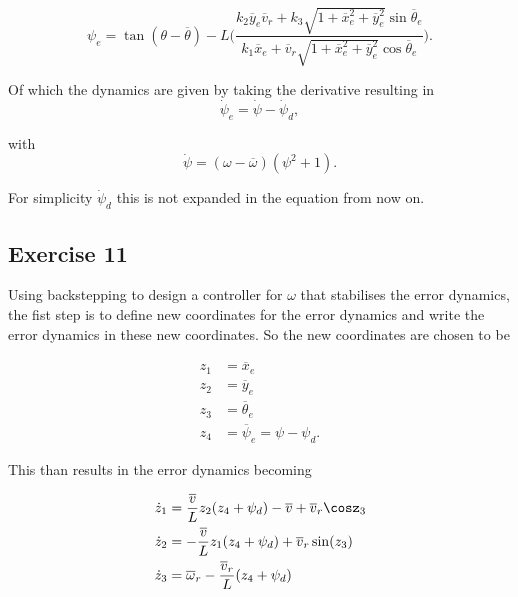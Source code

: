 \begin{equation}
    \psi_e = \tan(\theta-\overline{\theta}) - L \Big( \frac{k_2\overline{y}_e\overline{v}_r + k_3 \sqrt{1+\overline{x}_e^2+\overline{y}_e^2}\sin\overline{\theta}_e}{k_1\overline{x}_e + \overline{v}_r\sqrt{1+\overline{x}_e^2+\overline{y}_e^2}\cos\overline{\theta}_e} \Big). \label{eq:ex10_psi_e}
\end{equation}

Of which the dynamics are given by taking the derivative resulting in
\begin{equation}
    \dot{\psi}_e = \dot{\psi} - \dot{\psi}_d, \label{eq:ex10_psiedot}
\end{equation}

with
\begin{equation}
    \dot{\psi} = (\omega - \overline{\omega})(\psi^2 + 1). \label{eq:ex10_psidot}
\end{equation}

For simplicity $\dot{\psi}_d$ this is not expanded in the equation from now on.

\subsection{Exercise 11}
Using backstepping to design a controller for $\omega$ that stabilises the error dynamics, the fist step is to define new coordinates for the error dynamics and write the error dynamics in these new coordinates. So the new coordinates are chosen to be

\begin{align}
    z_1 &= \overline{x}_e \label{eq:ex11_newcoordsz_1} \\
    z_2 &= \overline{y}_e \label{eq:ex11_newcoordsz_2} \\
    z_3 &= \overline{\theta}_e \label{eq:ex11_newcoordsz_3} \\
    z_4 &= \overline{\psi}_e  = \psi - \psi_d \label{eq:ex11_newcoordsz_4}.
\end{align}

This than results in the error dynamics becoming

\begin{align}
    \dot{z}_1 &= \frac{\overline{v}}{L}z_2(z_4+\psi_d) - \overline{v} + \overline{v}_r\cosz_3 \label{eq:ex11_dynz_1} \\
    \dot{z}_2 &= -\frac{\overline{v}}{L}z_1(z_4+\psi_d) + \overline{v}_r\sin(z_3) \label{eq:ex11_dynz_2}\\
    \dot{z}_3 &= \overline{\omega}_r - \frac{\overline{v}_r}{L}(z_4+\psi_d)
\end{align}



